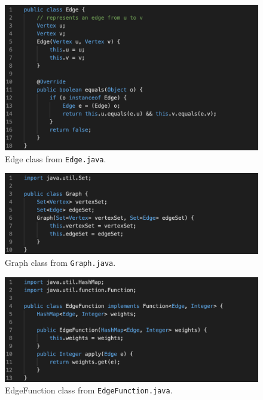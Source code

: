 \documentclass[12pt]{article}
\begin{document}
\begin{figure}[h]
  \centering
    \includegraphics[scale=.5]{figures/edge.png}
        \caption{Edge class from \texttt{Edge.java}.}
\end{figure}

\begin{figure}[h]
  \centering
    \includegraphics[scale=.5]{figures/graph.png}
        \caption{Graph class from \texttt{Graph.java}.}
\end{figure}

\begin{figure}[h]
  \centering
    \includegraphics[scale=.5]{figures/function.png}
        \caption{EdgeFunction class from \texttt{EdgeFunction.java}.}
\end{figure}
\end{document}
